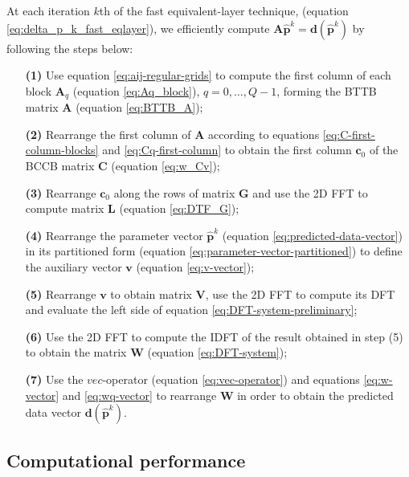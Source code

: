 At each iteration $k$th of the fast equivalent-layer technique, 
(equation \ref{eq:delta_p_k_fast_eqlayer}), we efficiently compute 
$\mathbf{A} \hat{\mathbf{p}}^{k} = \mathbf{d}(\hat{\mathbf{p}}^{k})$ by following 
the steps below:

\begin{itemize}
\item[\textbf{(1)}] Use equation \ref{eq:aij-regular-grids} to compute the first column 
of each block $\mathbf{A}_{q}$ (equation \ref{eq:Aq_block}), $q = 0, \dots, Q-1$, forming 
the BTTB matrix $\mathbf{A}$ (equation \ref{eq:BTTB_A});

\item[\textbf{(2)}] Rearrange the first column of $\mathbf{A}$ according to equations 
\ref{eq:C-first-column-blocks} and \ref{eq:Cq-first-column} to obtain the
first column $\mathbf{c}_{0}$ of the BCCB matrix $\mathbf{C}$ (equation \ref{eq:w_Cv});

\item[\textbf{(3)}] Rearrange $\mathbf{c}_{0}$ along the rows of matrix $\mathbf{G}$ and
use the 2D FFT to compute matrix $\mathbf{L}$ (equation \ref{eq:DTF_G});

\item[\textbf{(4)}] Rearrange the parameter vector $\hat{\mathbf{p}}^{k}$ 
(equation \ref{eq:predicted-data-vector}) in its partitioned form 
(equation \ref{eq:parameter-vector-partitioned}) to define the auxiliary vector 
$\mathbf{v}$ (equation \ref{eq:v-vector});

\item[\textbf{(5)}] Rearrange $\mathbf{v}$ to obtain matrix $\mathbf{V}$, use the 2D FFT 
to compute its DFT and evaluate the left side of equation \ref{eq:DFT-system-preliminary};

\item[\textbf{(6)}] Use the 2D FFT to compute the IDFT of the result obtained in step (5) to 
obtain the matrix $\mathbf{W}$ (equation \ref{eq:DFT-system});

\item[\textbf{(7)}] Use the $vec$-operator (equation \ref{eq:vec-operator}) and equations 
\ref{eq:w-vector} and \ref{eq:wq-vector} to rearrange $\mathbf{W}$ in order to obtain the predicted 
data vector $\mathbf{d}(\hat{\mathbf{p}}^{k})$.

\end{itemize}


\subsection{Computational performance}


